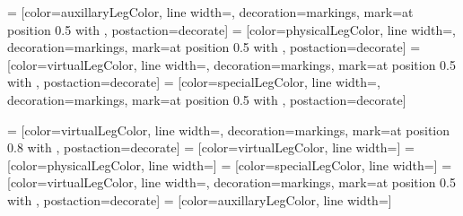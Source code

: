  = [color=auxillaryLegColor, line width=, decoration={markings, mark=at position 0.5 with {}}, postaction={decorate}]
 = [color=physicalLegColor, line width=, decoration={markings, mark=at position 0.5 with {}}, postaction={decorate}]
 = [color=virtualLegColor, line width=, decoration={markings, mark=at position 0.5 with {}}, postaction={decorate}]
 = [color=specialLegColor, line width=, decoration={markings, mark=at position 0.5 with {}}, postaction={decorate}]

 = [color=virtualLegColor, line width=, decoration={markings, mark=at position 0.8 with {}}, postaction={decorate}]
 = [color=virtualLegColor, line width=]
 = [color=physicalLegColor, line width=]
 = [color=specialLegColor, line width=]
 = [color=virtualLegColor, line width=, decoration={markings, mark=at position 0.5 with {}}, postaction={decorate}]
 = [color=auxillaryLegColor, line width=]

